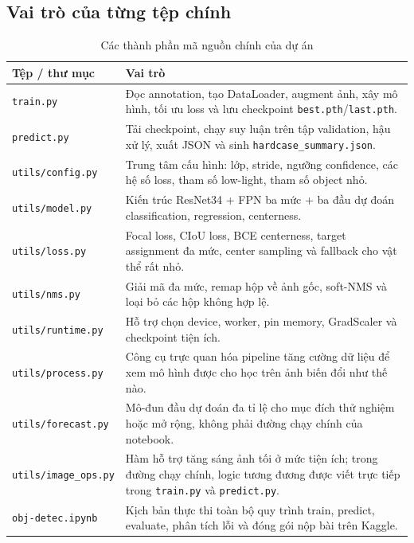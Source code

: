 \documentclass[12pt,a4paper]{article}
\begin{document}
\subsection{Vai trò của từng tệp chính}
\begin{table}[H]
\centering
\caption{Các thành phần mã nguồn chính của dự án}
\label{tab:file-roles}
\begin{tabularx}{\textwidth}{>{\raggedright\arraybackslash}p{3.2cm}Y}
\toprule
Tệp / thư mục & Vai trò \\
\midrule
\texttt{train.py} & Đọc annotation, tạo DataLoader, augment ảnh, xây mô hình, tối ưu loss và lưu checkpoint \texttt{best.pth}/\texttt{last.pth}. \\
\texttt{predict.py} & Tải checkpoint, chạy suy luận trên tập validation, hậu xử lý, xuất JSON và sinh \texttt{hardcase\_summary.json}. \\
\texttt{utils/config.py} & Trung tâm cấu hình: lớp, stride, ngưỡng confidence, các hệ số loss, tham số low-light, tham số object nhỏ. \\
\texttt{utils/model.py} & Kiến trúc ResNet34 + FPN ba mức + ba đầu dự đoán classification, regression, centerness. \\
\texttt{utils/loss.py} & Focal loss, CIoU loss, BCE centerness, target assignment đa mức, center sampling và fallback cho vật thể rất nhỏ. \\
\texttt{utils/nms.py} & Giải mã đa mức, remap hộp về ảnh gốc, soft-NMS và loại bỏ các hộp không hợp lệ. \\
\texttt{utils/runtime.py} & Hỗ trợ chọn device, worker, pin memory, GradScaler và checkpoint tiện ích. \\
\texttt{utils/process.py} & Công cụ trực quan hóa pipeline tăng cường dữ liệu để xem mô hình được cho học trên ảnh biến đổi như thế nào. \\
\texttt{utils/forecast.py} & Mô-đun đầu dự đoán đa tỉ lệ cho mục đích thử nghiệm hoặc mở rộng, không phải đường chạy chính của notebook. \\
\texttt{utils/image\_ops.py} & Hàm hỗ trợ tăng sáng ảnh tối ở mức tiện ích; trong đường chạy chính, logic tương đương được viết trực tiếp trong \texttt{train.py} và \texttt{predict.py}. \\
\texttt{obj-detec.ipynb} & Kịch bản thực thi toàn bộ quy trình train, predict, evaluate, phân tích lỗi và đóng gói nộp bài trên Kaggle. \\
\bottomrule
\end{tabularx}
\end{table}
\end{document}
